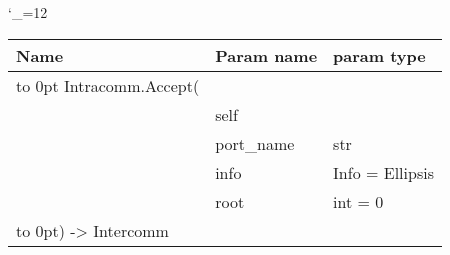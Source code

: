 \begingroup \catcode`\_=12 \tt
\begin{tabular}{lll}
\toprule
\textrm{Name}&\textrm{Param name}&\textrm{param type}\\
\midrule
\hbox to 0pt {Intracomm.Accept(\hss}\\
& self\\
& port_name & str\\
& info & Info = Ellipsis\\
& root & int = 0\\
\hbox to 0pt{) -> Intercomm\hss}\\
\bottomrule
\end{tabular}
\endgroup
